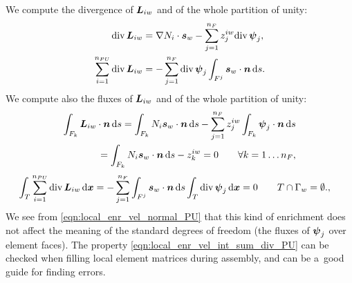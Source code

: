 We compute the divergence of $\mathbf{\boldsymbol{L}}_{iw}$ and of the whole partition of unity:
\begin{align}
    {\rm div}\,\mathbf{\boldsymbol{L}}_{iw} &= \nabla N_i \cdot \mathbf{\boldsymbol{s}}_w - \sum \limits_{j=1}^{n_F} z^{iw}_j {\rm div}\,\mathbf{\boldsymbol{\psi}}_j
    \label{eqn:local_enr_vel_div}, \\
    \sum \limits_{i=1}^{n_{PU}} {\rm div}\,\mathbf{\boldsymbol{L}}_{iw} &= - \sum \limits_{j=1}^{n_F} {\rm div}\,\mathbf{\boldsymbol{\psi}}_j \int_{F^j} \mathbf{\boldsymbol{s}}_w\cdot\mathbf{\boldsymbol{n}} \,{\rm d} s.
    \label{eqn:local_enr_vel_sum_div_PU}
\end{align}
We compute also the fluxes of $\mathbf{\boldsymbol{L}}_{iw}$ and of the whole partition of unity:
\begin{align}
    \int_{F_k} \mathbf{\boldsymbol{L}}_{iw}\cdot\mathbf{\boldsymbol{n}} \,{\rm d} s = \int_{F_k} N_i \mathbf{\boldsymbol{s}}_w\cdot\mathbf{\boldsymbol{n}} \,{\rm d} s
        - \sum \limits_{j=1}^{n_F} z^{iw}_j \int_{F_k} \mathbf{\boldsymbol{\psi}}_j \cdot \mathbf{\boldsymbol{n}} \,{\rm d} s \nonumber\\
    = \int_{F_k} N_i \mathbf{\boldsymbol{s}}_w\cdot\mathbf{\boldsymbol{n}} \,{\rm d} s - z^{iw}_k = 0 \qquad \forall k=1\ldots n_F
    \label{eqn:local_enr_vel_normal_PU},
\end{align}
\begin{align}
    \int_{T} \sum \limits_{i=1}^{n_{PU}} \div\,\vc L_{iw}\dd\bx =
        - \sum \limits_{j=1}^{n_F} \int_{F^j} \vc s_w\cdot\vc n \dd s
        \int_T \div\,\vc\psi_j \dd \bx %
        = 0 & \qquad T \cap \Gamma_w=\emptyset.
    \label{eqn:local_enr_vel_int_sum_div_PU},
\end{align}
We see from \eqref{eqn:local_enr_vel_normal_PU} that this kind of enrichment does not affect the meaning of the standard
degrees of freedom (the fluxes of $\mathbf{\boldsymbol{\psi}}_j$ over element faces).
The property \eqref{eqn:local_enr_vel_int_sum_div_PU} can be checked when filling local element matrices during assembly,
and can be a~good guide for finding errors.

